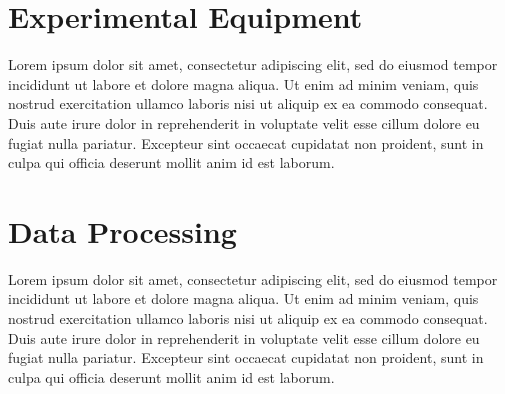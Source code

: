 \documentclass[12pt]{report}   %
\begin{document}


\begin{appendices}



\chapter{ Experimental Equipment}
Lorem ipsum dolor sit amet, consectetur adipiscing elit, sed do eiusmod tempor incididunt ut labore et dolore magna aliqua. Ut enim ad minim veniam, quis nostrud exercitation ullamco laboris nisi ut aliquip ex ea commodo consequat. Duis aute irure dolor in reprehenderit in voluptate velit esse cillum dolore eu fugiat nulla pariatur. Excepteur sint occaecat cupidatat non proident, sunt in culpa qui officia deserunt mollit anim id est laborum.

\chapter{Data Processing}
Lorem ipsum dolor sit amet, consectetur adipiscing elit, sed do eiusmod tempor incididunt ut labore et dolore magna aliqua. Ut enim ad minim veniam, quis nostrud exercitation ullamco laboris nisi ut aliquip ex ea commodo consequat. Duis aute irure dolor in reprehenderit in voluptate velit esse cillum dolore eu fugiat nulla pariatur. Excepteur sint occaecat cupidatat non proident, sunt in culpa qui officia deserunt mollit anim id est laborum.

\end{appendices}
\end{document}
